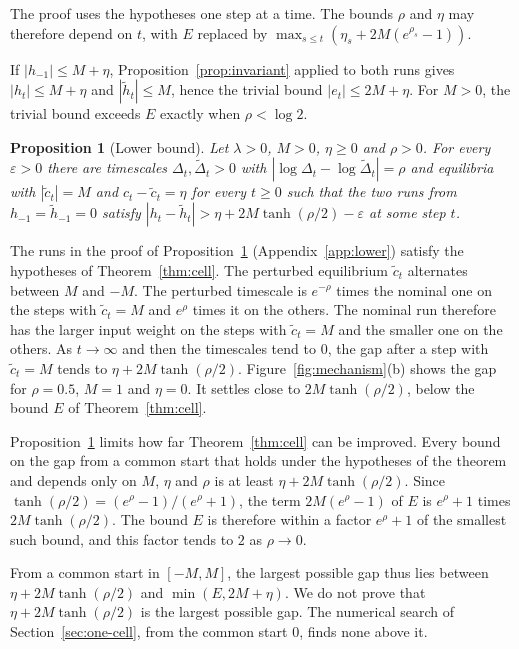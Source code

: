 \documentclass[11pt, a4paper]{article}
\newtheorem{proposition}{Proposition}
\theoremstyle{remark}
\theoremstyle{plain}
\begin{document}
The proof uses the hypotheses one step at a time. The bounds $\rho$ and $\eta$ may therefore
depend on $t$, with $E$ replaced by $\max_{s \le t}(\eta_s + 2M(e^{\rho_s} - 1))$.

If $|h_{-1}| \le M + \eta$, Proposition~\ref{prop:invariant} applied to both runs gives
$|h_t| \le M + \eta$ and $|\tilde h_t| \le M$, hence the trivial bound $|e_t| \le 2M + \eta$. For
$M > 0$, the trivial bound exceeds $E$ exactly when $\rho < \log 2$.

\begin{proposition}[Lower bound]
\label{prop:lower}
Let $\lambda > 0$, $M > 0$, $\eta \ge 0$ and $\rho > 0$. For every $\varepsilon > 0$ there are
timescales $\Delta_t, \tilde\Delta_t > 0$ with $|\log\Delta_t - \log\tilde\Delta_t| = \rho$ and
equilibria with $|\tilde c_t| = M$ and $c_t - \tilde c_t = \eta$ for every $t \ge 0$ such that
the two runs from $h_{-1} = \tilde h_{-1} = 0$ satisfy
$|h_t - \tilde h_t| > \eta + 2M\tanh(\rho/2) - \varepsilon$ at some step $t$.
\end{proposition}

The runs in the proof of Proposition~\ref{prop:lower} (Appendix~\ref{app:lower}) satisfy the
hypotheses of Theorem~\ref{thm:cell}. The perturbed equilibrium $\tilde c_t$ alternates between
$M$ and $-M$. The perturbed timescale is $e^{-\rho}$ times the nominal one on the steps with
$\tilde c_t = M$ and $e^{\rho}$ times it on the others. The nominal run therefore has the larger
input weight on the steps with $\tilde c_t = M$ and the smaller one on the others. As
$t \to \infty$ and then the timescales tend to $0$, the gap after a step with $\tilde c_t = M$
tends to $\eta + 2M\tanh(\rho/2)$. Figure~\ref{fig:mechanism}(b) shows the gap for $\rho = 0.5$,
$M = 1$ and $\eta = 0$. It settles close to $2M\tanh(\rho/2)$, below the bound $E$ of
Theorem~\ref{thm:cell}.

Proposition~\ref{prop:lower} limits how far Theorem~\ref{thm:cell} can be improved. Every bound on
the gap from a common start that holds under the hypotheses of the theorem and depends only on
$M$, $\eta$ and $\rho$ is at least $\eta + 2M\tanh(\rho/2)$. Since
$\tanh(\rho/2) = (e^{\rho} - 1)/(e^{\rho} + 1)$, the term $2M(e^{\rho} - 1)$ of $E$ is
$e^{\rho} + 1$ times $2M\tanh(\rho/2)$. The bound $E$ is therefore within a factor $e^{\rho} + 1$
of the smallest such bound, and this factor tends to $2$ as $\rho \to 0$.

From a common start in $[-M, M]$, the largest possible gap thus lies between
$\eta + 2M\tanh(\rho/2)$ and $\min(E, 2M + \eta)$. We do not prove that $\eta + 2M\tanh(\rho/2)$ is
the largest possible gap. The numerical search of Section~\ref{sec:one-cell}, from the common start
$0$, finds none above it.
\end{document}
